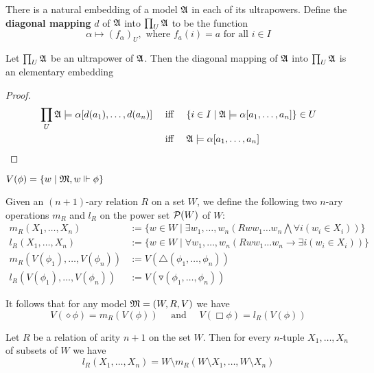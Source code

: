 \documentclass[11pt]{article}
\begin{document}
There is a natural embedding of a model \(\mathfrak{A}\) in each of its ultrapowers.
Define the \textbf{diagonal mapping} \(d\) of \(\mathfrak{A}\) into \(\prod_U\mathfrak{A}\) to be the
function
\begin{equation*}
\alpha\mapsto(f_\alpha)_U,\text{ where }f_a(i)=a\text{ for all }i\in I
\end{equation*}

\begin{corollary}[]
Let \(\prod_U\mathfrak{A}\) be an ultrapower of \(\mathfrak{A}\). Then the diagonal mapping of
\(\mathfrak{A}\) into \(\prod_U\mathfrak{A}\) is an elementary embedding
\end{corollary}

\begin{proof}
\begin{align*}
\prod_U\mathfrak{A}\models\alpha[d(a_1),\dots,d(a_n)]&\quad\text{ iff }\quad
\{i\in I\mid\mathfrak{A}\models\alpha[a_1,\dots,a_n]\}\in U\\
&\quad\text{ iff }\quad \mathfrak{A}\models\alpha[a_1,\dots,a_n]
\end{align*}
\end{proof}


\(V(\phi)=\{w\mid \mathfrak{M},w\Vdash\phi\}\)

\begin{definition}[]
Given an \((n+1)\)-ary relation \(R\) on a set \(W\), we define the
following two \(n\)-ary operations \(m_R\) and \(l_R\) on the power set
\(\mathcal{P}(W)\) of \(W\):
\begin{align*}
m_R(X_1,\dots,X_n)&:=\{w\in W\mid\exists w_1,\dots,w_n
(Rww_1\dots w_n\bigwedge\forall i(w_i\in X_i))\}\\
l_R(X_1,\dots,X_n)&:=\{w\in W\mid\forall w_1,\dots,w_n
(Rww_1\dots w_n\to\exists i(w_i\in X_i))\}\\
m_R(V(\phi_1),\dots,V(\phi_n))&:=V(\triangle(\phi_1,\dots,\phi_n))\\
l_R(V(\phi_1),\dots,V(\phi_n))&:=V(\triangledown(\phi_1,\dots,\phi_n))
\end{align*}
\end{definition}

It follows that for any  model \(\mathfrak{M}=(W,R,V)\) we have
\begin{equation*}
V(\diamond\phi)=m_R(V(\phi))\quad\text{ and }\quad
V(\Box\phi)=l_R(V(\phi))
\end{equation*}

\begin{proposition}[]
Let \(R\) be a relation of arity \(n+1\) on the set \(W\). Then for every
\(n\)-tuple \(X_1,\dots,X_n\) of subsets of \(W\) we have
\begin{equation*}
l_R(X_1,\dots,X_n)=W\setminus m_R(W\setminus X_1,\dots,W\setminus X_n)
\end{equation*}
\end{proposition}
\end{document}
